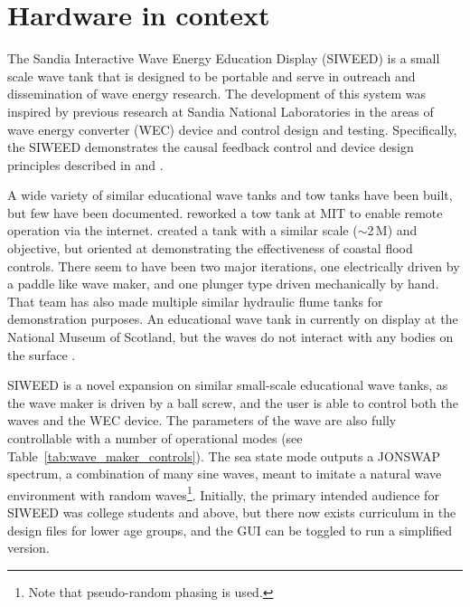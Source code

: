 \documentclass[11pt, letterpaper]{article}
\begin{document}
\section{Hardware in context} %
The Sandia Interactive Wave Energy Education Display (SIWEED) is a small scale wave tank that is designed to be portable and serve in outreach and dissemination of wave energy research.
The development of this system was inspired by previous research at Sandia National Laboratories in the areas of wave energy converter (WEC) device and control design and testing.
Specifically, the SIWEED demonstrates the causal feedback control and device design principles described in \citet{Bacelli2020} and \citet{Coe2020a}.


A wide variety of similar educational wave tanks and tow tanks have been built, but few have been documented.
\citet{unger2006creating} reworked a tow tank at MIT to enable remote operation via the internet.
\citet{Trust2015} created a tank with a similar scale ($\sim$2\,M) and objective, but oriented at demonstrating the effectiveness of coastal flood controls.
There seem to have been two major iterations, one electrically driven by a paddle like wave maker, and one plunger type driven mechanically by hand. 
That team has also made multiple similar hydraulic flume tanks for demonstration purposes.
An educational wave tank in currently on display at the National Museum of Scotland, but the waves do not interact with any bodies on the surface \citet{Ivan2016}. 

SIWEED is a novel expansion on similar small-scale educational wave tanks, as the wave maker is driven by a ball screw, and the user is able to control both the waves and the WEC device.
The parameters of the wave are also fully controllable with a number of operational modes (see Table~\ref{tab:wave_maker_controls}).
The sea state mode outputs a JONSWAP spectrum, a combination of many sine waves, meant to imitate a natural wave environment with random waves\footnote{Note that pseudo-random phasing is used.}.
Initially, the primary intended audience for SIWEED was college students and above, but there now exists curriculum in the design files for lower age groups, and the GUI can be toggled to run a simplified version.
\end{document}
